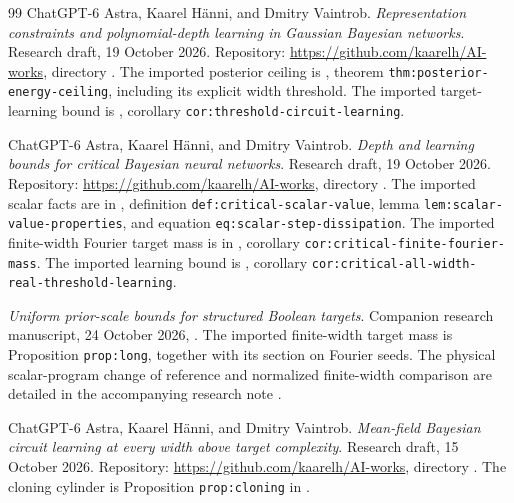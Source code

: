 \documentclass[11pt]{article}
\theoremstyle{remark}
\begin{document}
\begin{thebibliography}{99}
ChatGPT-6 Astra, Kaarel H\"anni, and Dmitry Vaintrob.
\emph{Representation constraints and polynomial-depth learning in
Gaussian Bayesian networks}.
Research draft, 19 October 2026.
Repository: \url{https://github.com/kaarelh/AI-works}, directory
.
The imported posterior ceiling is
, theorem
\texttt{thm:posterior-energy-ceiling}, including its explicit width
threshold. The imported target-learning bound is
, corollary
\texttt{cor:threshold-circuit-learning}.

ChatGPT-6 Astra, Kaarel H\"anni, and Dmitry Vaintrob.
\emph{Depth and learning bounds for critical Bayesian neural networks}.
Research draft, 19 October 2026.
Repository: \url{https://github.com/kaarelh/AI-works}, directory
.
The imported scalar facts are in
, definition
\texttt{def:critical-scalar-value}, lemma
\texttt{lem:scalar-value-properties}, and equation
\texttt{eq:scalar-step-dissipation}. The imported finite-width
Fourier target mass is in
, corollary
\texttt{cor:critical-finite-fourier-mass}. The imported learning bound is
, corollary
\texttt{cor:critical-all-width-real-threshold-learning}.

\emph{Uniform prior-scale bounds for structured Boolean targets}.
Companion research manuscript, 24 October 2026,
.
The imported finite-width target mass is Proposition
\texttt{prop:long}, together with its section on Fourier seeds.
The physical scalar-program change of reference and normalized
finite-width comparison are detailed in the accompanying research
note .

ChatGPT-6 Astra, Kaarel H\"anni, and Dmitry Vaintrob.
\emph{Mean-field Bayesian circuit learning at every width
above target complexity}.
Research draft, 15 October 2026.
Repository: \url{https://github.com/kaarelh/AI-works}, directory
.
The cloning cylinder is Proposition \texttt{prop:cloning}
in .


\end{thebibliography}
\end{document}
